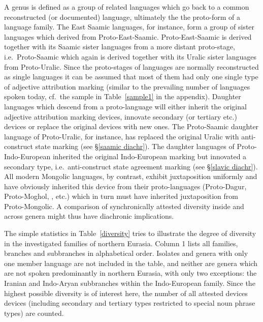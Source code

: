 A genus is defined as a group of related languages which go back to a common reconstructed (or documented) language, ultimately the the proto-form of a language family. The East Saamic languages, for instance, form a group of sister languages which derived from Proto\hyp{}East-Saamic. Proto\hyp{}East-Saamic is derived together with its Saamic sister languages from a more distant proto-stage, i.e.~Proto\hyp{}Saamic which again is derived together with its Uralic sister languages from Proto\hyp{}Uralic. Since the proto-stages of languages are normally reconstructed as single languages it can be assumed that most of them had only one single type of adjective attribution marking (similar to the prevailing number of languages spoken today, cf.~the sample in Table~\ref{sample1} in the appendix). Daughter languages which descend from a proto-language will either inherit the original adjective attribution marking devices, innovate secondary (or tertiary etc.) devices or replace the original devices with new ones. The Proto\hyp{}Saamic daughter language of Proto\hyp{}Uralic, for instance, has replaced the original Uralic  with anti\hyp{}construct state marking (see \S\ref{saamic diachr}). The  daughter languages of Proto\hyp{}Indo-European inherited the original Indo-European  marking but innovated a secondary type, i.e.~anti\hyp{}construct state agreement marking (see \S\ref{slavic diachr}). All modern Mongolic languages, by contrast, exhibit juxtaposition uniformly and have obviously inherited this device from their proto-languages (Proto\hyp{}Dagur, Proto\hyp{}Moghol, , etc.) which in turn must have inherited juxtaposition from Proto\hyp{}Mongolic. A comparison of synchronically attested diversity inside and across genera might thus have diachronic implications.

The simple statistics in Table~\ref{diversity} tries to illustrate the degree of diversity in the investigated families of northern Eurasia. Column 1 lists all families, branches and subbranches in alphabetical order. Isolates and genera with only one member language are not included in the table, and neither are genera which are not spoken predominantly in northern Eurasia, with only two exceptions: the Iranian and Indo-Aryan subbranches within the Indo-European family. Since the highest possible diversity is of interest here, the number of all attested devices devices (including secondary and tertiary types restricted to special noun phrase types) are counted. 

